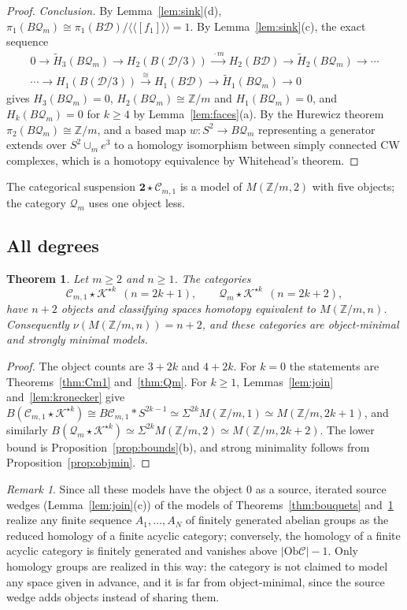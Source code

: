 \documentclass[12pt]{amsart}
\newtheorem{theorem}[teo]{Theorem}
\theoremstyle{definition}
\theoremstyle{remark}
\newtheorem{remark}[teo]{Remark}
\newcommand{\CC}{\mathcal{C}}
\newcommand{\DD}{\mathcal{D}}
\newcommand{\co}{\colon}
\newcommand{\Ob}{\mathrm{Ob}}
\newcommand{\Z}{\mathbb{Z}}
\newcommand{\K}{\mathcal{K}}
\newcommand{\Q}{\mathcal{Q}}
\newcommand{\M}{M}
\begin{document}
\begin{proof}
\emph{Conclusion.} By Lemma~\ref{lem:sink}(d), $\pi_1(B\Q_m)\cong\pi_1(B\DD)/\langle\!\langle[f_1]\rangle\!\rangle=1$. By Lemma~\ref{lem:sink}(c), the exact sequence
\begin{gather*}
0\to\widetilde H_3(B\Q_m)\to H_2(B(\DD/3))\xrightarrow{\ \cdot m\ }H_2(B\DD)\to\widetilde H_2(B\Q_m)\to\cdots\\
\cdots\to H_1(B(\DD/3))\xrightarrow{\ \cong\ }H_1(B\DD)\to\widetilde H_1(B\Q_m)\to0
\end{gather*}
gives $H_3(B\Q_m)=0$, $H_2(B\Q_m)\cong\Z/m$ and $H_1(B\Q_m)=0$, and $H_k(B\Q_m)=0$ for $k\ge4$ by Lemma~\ref{lem:faces}(a). By the Hurewicz theorem $\pi_2(B\Q_m)\cong\Z/m$, and a based map $w\co S^2\to B\Q_m$ representing a generator extends over $S^2\cup_me^3$ to a homology isomorphism between simply connected CW complexes, which is a homotopy equivalence by Whitehead's theorem.
\end{proof}

The categorical suspension $\mathbf 2\star\CC_{m,1}$ is a model of $\M(\Z/m,2)$ with five objects; the category $\Q_m$ uses one object less.

\subsection{All degrees}\label{subsec:moore-all}

\begin{theorem}\label{thm:moore}
Let $m\ge2$ and $n\ge1$. The categories
\[
\CC_{m,1}\star\K^{\star k}\ \ (n=2k+1),\qquad \Q_m\star\K^{\star k}\ \ (n=2k+2),
\]
have $n+2$ objects and classifying spaces homotopy equivalent to $\M(\Z/m,n)$. Consequently $\nu(\M(\Z/m,n))=n+2$, and these categories are object-minimal and strongly minimal models.
\end{theorem}

\begin{proof}
The object counts are $3+2k$ and $4+2k$. For $k=0$ the statements are Theorems~\ref{thm:Cm1} and~\ref{thm:Qm}. For $k\ge1$, Lemmas~\ref{lem:join} and~\ref{lem:kronecker} give $B(\CC_{m,1}\star\K^{\star k})\cong B\CC_{m,1}*S^{2k-1}\simeq\Sigma^{2k}\M(\Z/m,1)\simeq\M(\Z/m,2k+1)$, and similarly $B(\Q_m\star\K^{\star k})\simeq\Sigma^{2k}\M(\Z/m,2)\simeq\M(\Z/m,2k+2)$. The lower bound is Proposition~\ref{prop:bounds}(b), and strong minimality follows from Proposition~\ref{prop:objmin}.
\end{proof}

\begin{remark}\label{rem:realization}
Since all these models have the object $0$ as a source, iterated source wedges (Lemma~\ref{lem:join}(c)) of the models of Theorems~\ref{thm:bouquets} and~\ref{thm:moore} realize any finite sequence $A_1,\dots,A_N$ of finitely generated abelian groups as the reduced homology of a finite acyclic category; conversely, the homology of a finite acyclic category is finitely generated and vanishes above $|\Ob\CC|-1$. Only homology groups are realized in this way: the category is not claimed to model any space given in advance, and it is far from object-minimal, since the source wedge adds objects instead of sharing them.
\end{remark}
\end{document}
